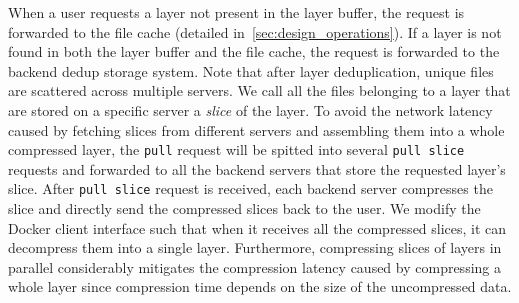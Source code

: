 When a user requests a
layer not present in the layer buffer, the request is forwarded to the
file cache (detailed in~\cref{sec:design_operations}). 
If a layer is not found in both the layer buffer and the
file cache, the request is forwarded to the backend dedup storage system.
Note that after layer deduplication, unique files are
scattered across multiple servers.
We call all the files belonging to a layer that are stored on a specific server a
\emph{slice} of the layer.
To avoid the network latency caused by fetching slices from different servers and
assembling them into a whole compressed layer, the \texttt{pull} request will
be spitted into several \texttt{pull slice} requests and 
forwarded to all the backend servers that store the requested
layer's slice.  
After \texttt{pull slice} request is received, each backend server compresses the slice 
and directly send the compressed slices back to the user.
We modify the Docker client
interface such that when it receives all the compressed slices, it can
decompress them into a single layer. 
Furthermore, compressing slices
of layers in parallel considerably mitigates the compression latency caused by
compressing a whole layer since compression time depends on the size of the
uncompressed data.



 
